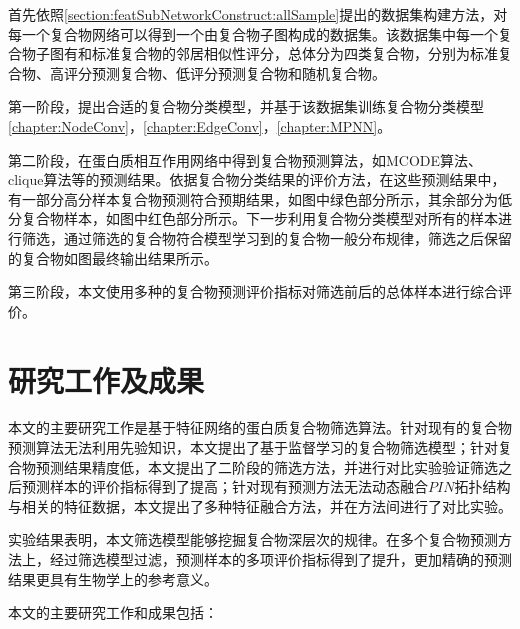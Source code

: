 首先依照\ref{section:featSubNetworkConstruct:allSample}提出的数据集构建方法，对每一个复合物网络可以得到一个由复合物子图构成的数据集。该数据集中每一个复合物子图有和标准复合物的邻居相似性评分，总体分为四类复合物，分别为标准复合物、高评分预测复合物、低评分预测复合物和随机复合物。

第一阶段，提出合适的复合物分类模型，并基于该数据集训练复合物分类模型\ref{chapter:NodeConv}，\ref{chapter:EdgeConv}，\ref{chapter:MPNN}。

第二阶段，在蛋白质相互作用网络中得到复合物预测算法，如MCODE算法、clique算法等的预测结果。依据复合物分类结果的评价方法，在这些预测结果中，有一部分高分样本复合物预测符合预期结果，如图中绿色部分所示，其余部分为低分复合物样本，如图中红色部分所示。下一步利用复合物分类模型对所有的样本进行筛选，通过筛选的复合物符合模型学习到的复合物一般分布规律，筛选之后保留的复合物如图最终输出结果所示。

第三阶段，本文使用多种的复合物预测评价指标对筛选前后的总体样本进行综合评价。

\section{研究工作及成果}
\label{section:intro:workandresult}

本文的主要研究工作是基于特征网络的蛋白质复合物筛选算法。针对现有的复合物预测算法无法利用先验知识，本文提出了基于监督学习的复合物筛选模型；针对复合物预测结果精度低，本文提出了二阶段的筛选方法，并进行对比实验验证筛选之后预测样本的评价指标得到了提高；针对现有预测方法无法动态融合$PIN$拓扑结构与相关的特征数据，本文提出了多种特征融合方法，并在方法间进行了对比实验。

实验结果表明，本文筛选模型能够挖掘复合物深层次的规律。在多个复合物预测方法上，经过筛选模型过滤，预测样本的多项评价指标得到了提升，更加精确的预测结果更具有生物学上的参考意义。

本文的主要研究工作和成果包括：

